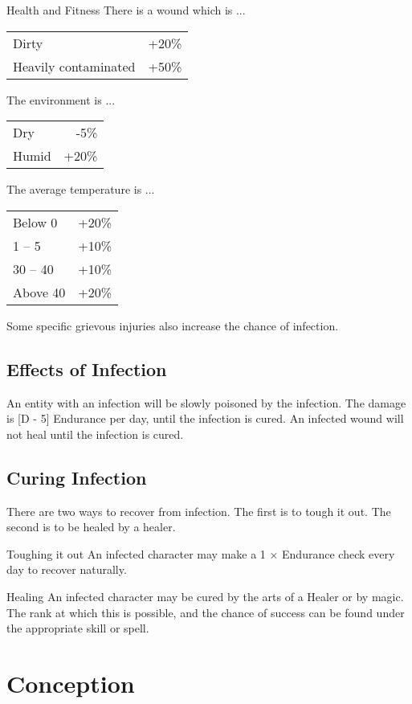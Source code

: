 \begin{Chapter}{Health and Fitness}
There is a wound which is ... \\
\begin{tabularx}{\columnwidth}{Xr}
Dirty 			& +20\% \\ 
Heavily contaminated	& +50\% \\
\end{tabularx}

The environment is ... \\
\begin{tabularx}{\columnwidth}{Xr}
Dry		& -5\% \\  
Humid		& +20\% \\
\end{tabularx}

The average temperature is ... \\
\begin{tabularx}{\columnwidth}{Xr}
Below 0		& +20\% \\
1 – 5		& +10\% \\
30 – 40		& +10\% \\
Above 40	& +20\% \\
\end{tabularx}

Some specific grievous injuries also increase the chance of infection.

\subsection{Effects of Infection}

An entity with an infection will be slowly poisoned by the
infection. The damage is [D - 5] Endurance per day, until the
infection is cured.  An infected wound will not heal until the
infection is cured.

\subsection{Curing Infection}

There are two ways to recover from infection. The first is to tough it
out.  The second is to be healed by a healer.

Toughing it out An infected character may make a 1 × Endurance check
every day to recover naturally.

Healing An infected character may be cured by the arts of a Healer or
by magic. The rank at which this is possible, and the chance of
success can be found under the appropriate skill or spell.

\section{Conception}


\end{Chapter}
